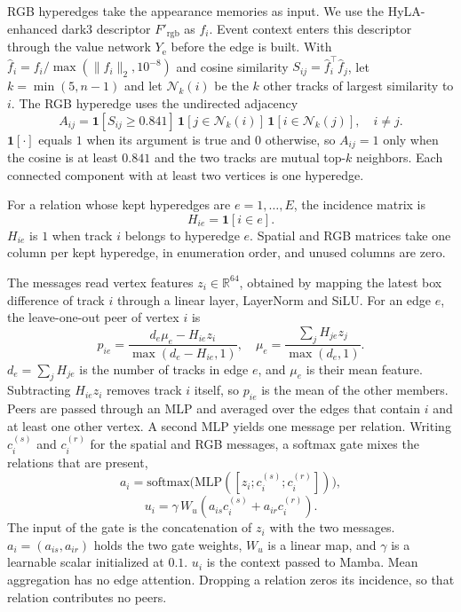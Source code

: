 \documentclass[10pt,twocolumn,letterpaper]{article}
\begin{document}
RGB hyperedges take the appearance memories as input. We use the HyLA-enhanced dark3 descriptor $F'_{\mathrm{rgb}}$ as $f_i$. Event context enters this descriptor through the value network $Y_{\mathrm{e}}$ before the edge is built. With $\hat f_i=f_i/\max(\lVert f_i\rVert_2,10^{-8})$ and cosine similarity $S_{ij}=\hat f_i^{\top}\hat f_j$, let $k=\min(5,n-1)$ and let $\mathcal{N}_k(i)$ be the $k$ other tracks of largest similarity to $i$. The RGB hyperedge uses the undirected adjacency
\begin{equation}
A_{ij}
=
\mathbf{1}[S_{ij}\ge 0.841]
\,\mathbf{1}[j\in\mathcal{N}_k(i)]
\,\mathbf{1}[i\in\mathcal{N}_k(j)],
\quad i\neq j.
\end{equation}
$\mathbf{1}[\cdot]$ equals $1$ when its argument is true and $0$ otherwise, so $A_{ij}=1$ only when the cosine is at least $0.841$ and the two tracks are mutual top-$k$ neighbors. Each connected component with at least two vertices is one hyperedge.



For a relation whose kept hyperedges are $e=1,\ldots,E$, the incidence matrix is
\begin{equation}
H_{ie}=\mathbf{1}[i\in e].
\end{equation}
$H_{ie}$ is $1$ when track $i$ belongs to hyperedge $e$. Spatial and RGB matrices take one column per kept hyperedge, in enumeration order, and unused columns are zero. 




The messages read vertex features $z_i\in\mathbb{R}^{64}$, obtained by mapping the latest box difference of track $i$ through a linear layer, LayerNorm and SiLU. For an edge $e$, the leave-one-out peer of vertex $i$ is
\begin{equation}
p_{ie}=\frac{d_e\mu_e-H_{ie}z_i}{\max(d_e-H_{ie},1)},
\quad
\mu_e=\frac{\sum_j H_{je}z_j}{\max(d_e,1)}.
\end{equation}
$d_e=\sum_j H_{je}$ is the number of tracks in edge $e$, and $\mu_e$ is their mean feature. Subtracting $H_{ie}z_i$ removes track $i$ itself, so $p_{ie}$ is the mean of the other members. Peers are passed through an MLP and averaged over the edges that contain $i$ and at least one other vertex. A second MLP yields one message per relation. Writing $c_i^{(s)}$ and $c_i^{(r)}$ for the spatial and RGB messages, a softmax gate mixes the relations that are present,
\begin{equation}
a_i=\mathrm{softmax}\big(\mathrm{MLP}([z_i;c_i^{(s)};c_i^{(r)}])\big),
\end{equation}
\begin{equation}
u_i=\gamma\,W_u\!\left(a_{is}c_i^{(s)}+a_{ir}c_i^{(r)}\right).
\end{equation}
The input of the gate is the concatenation of $z_i$ with the two messages. $a_i=(a_{is},a_{ir})$ holds the two gate weights, $W_u$ is a linear map, and $\gamma$ is a learnable scalar initialized at $0.1$. $u_i$ is the context passed to Mamba. Mean aggregation has no edge attention. Dropping a relation zeros its incidence, so that relation contributes no peers. 
\end{document}
